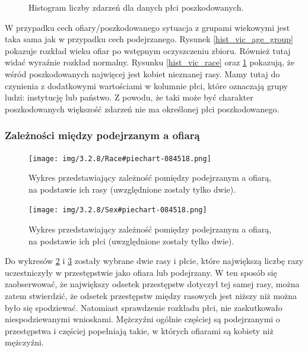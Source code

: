 \documentclass{classrep}
\begin{document}
{{{\begin{figure}[!htbp]
                    \caption{Histogram liczby zdarzeń dla danych płci poszkodowanych.}
                    \label{hist_vic_sex}
                \end{figure}
                \FloatBarrier
                W przypadku cech ofiary/poszkodowanego sytuacja z grupami wiekowymi jest taka sama jak w przypadku cech podejrzanego. Rysunek \ref{hist_vic_age_group} pokazuje rozkład wieku ofiar po wstępnym oczyszczeniu zbioru. Również tutaj widać wyraźnie rozkład normalny. Rysunku \ref{hist_vic_race} oraz \ref{hist_vic_sex} pokazują, że wśród poszkodowanych najwięcej jest kobiet nieznanej rasy. Mamy tutaj do czynienia z dodatkowymi wartościami w kolumnie płci, które oznaczają grupy ludzi: instytucję lub państwo. Z powodu, że taki może być charakter poszkodowanych większość zdarzeń nie ma określonej płci poszkodowanego.
            }

            \subsubsection{Zależności między podejrzanym a ofiarą} {
                \begin{figure}[!htbp]
                    \centering
                    \texttt{[image: img/3.2.8/Race\#piechart-084518.png]}
                    \caption{Wykres przedstawiający zależność pomiędzy podejrzanym a ofiarą, na podstawie ich rasy (uwzględnione zostały tylko dwie).}
                    \label{pie_chart_race}
                \end{figure}
                \begin{figure}[!htbp]
                    \centering
                    \texttt{[image: img/3.2.8/Sex\#piechart-084518.png]}
                    \caption{Wykres przedstawiający zależność pomiędzy podejrzanym a ofiarą, na podstawie ich płci (uwzględnione zostały tylko dwie).}
                    \label{pie_chart_sex}
                \end{figure}
                \FloatBarrier

                Do wykresów \ref{pie_chart_race} i \ref{pie_chart_sex} zostały wybrane
                dwie rasy i płcie, które największą liczbę razy uczestniczyły w
                przestępstwie jako ofiara lub podejrzany. W ten sposób się
                zaobserwować, że największy odsetek przestępstw dotyczył tej samej
                rasy, można zatem stwierdzić, że odsetek przestępstw między rasowych
                jest niższy niż można było się spodziewać. Natomiast sprawdzenie
                rozkładu płci, nie zaskutkowało niespodziewanymi wnioskami. Mężczyźni
                ogólnie częściej są podejrzanymi o przestępstwa i częściej popełniają
                takie, w których ofiarami są kobiety niż mężczyźni.
            }
        }

    }
    
\end{document}
